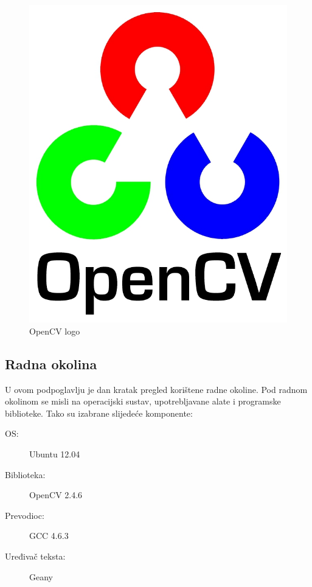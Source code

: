 \begin{figure}[h]
\centering
\includegraphics[scale=0.8]{figures/opencv.jpg}
\caption{OpenCV logo}
\label{fig:opencv.svg}
\end{figure}

\newpage
\subsection{Radna okolina} %
\label{sub:Radna okolina}

U ovom podpoglavlju je dan kratak pregled korištene radne okoline. Pod
radnom okolinom se misli na operacijski sustav, upotrebljavane alate i
programske biblioteke. Tako su izabrane slijedeće komponente:

\begin{description}
  \item[OS:] Ubuntu 12.04
  \item[Biblioteka:] OpenCV 2.4.6
  \item[Prevodioc:] GCC 4.6.3 
  \item[Uređivač teksta:] Geany
\end{description}

